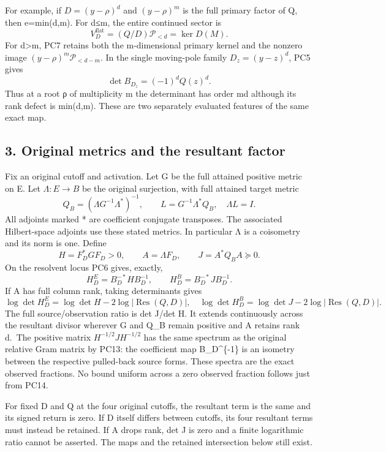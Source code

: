 \documentclass[11pt]{article}
\begin{document}
For example, if \(D=(y-\rho)^d\) and \((y-\rho)^m\) is the full primary factor of Q, then e=min(d,m). For d≤m, the entire continued sector is \[
V_D^{\mathrm{flat}}=(Q/D)\mathcal P_{<d}=\ker D(M).
\tag{PC9}
\] For d\textgreater m, PC7 retains both the m-dimensional primary kernel and the nonzero image \((y-\rho)^m\mathcal P_{<d-m}\). In the single moving-pole family \(D_z=(y-z)^d\), PC5 gives \[
\det B_{D_z}=(-1)^d Q(z)^d.
\tag{PC10}
\] Thus at a root ρ of multiplicity m the determinant has order md although its rank defect is min(d,m). These are two separately evaluated features of the same exact map.

\subsection{3. Original metrics and the resultant factor}\label{original-metrics-and-the-resultant-factor}

Fix an original cutoff and activation. Let G be the full attained positive metric on E. Let \(\Lambda:E\to B\) be the original surjection, with full attained target metric \[
Q_B=(\Lambda G^{-1}\Lambda^*)^{-1},\qquad
L=G^{-1}\Lambda^*Q_B,\quad \Lambda L=I.
\tag{PC11}
\] All adjoints marked * are coefficient conjugate transposes. The associated Hilbert-space adjoints use these stated metrics. In particular Λ is a coisometry and its norm is one. Define \[
H=F_D^*GF_D>0,\qquad A=\Lambda F_D,\qquad J=A^*Q_BA\succeq0.
\tag{PC12}
\] On the resolvent locus PC6 gives, exactly, \[
H_D^E=B_D^{-*}HB_D^{-1},\qquad
H_D^B=B_D^{-*}JB_D^{-1}.
\tag{PC13}
\] If A has full column rank, taking determinants gives \[
\log\det H_D^E=\log\det H-2\log|\operatorname{Res}(Q,D)|,
\quad
\log\det H_D^B=\log\det J-2\log|\operatorname{Res}(Q,D)|.
\tag{PC14}
\] The full source/observation ratio is det J/det H. It extends continuously across the resultant divisor wherever G and Q\_B remain positive and A retains rank d.~The positive matrix \(H^{-1/2}JH^{-1/2}\) has the same spectrum as the original relative Gram matrix by PC13: the coefficient map B\_D\^{}\{-1\} is an isometry between the respective pulled-back source forms. These spectra are the exact observed fractions. No bound uniform across a zero observed fraction follows just from PC14.

For fixed D and Q at the four original cutoffs, the resultant term is the same and its signed return is zero. If D itself differs between cutoffs, its four resultant terms must instead be retained. If A drops rank, det J is zero and a finite logarithmic ratio cannot be asserted. The maps and the retained intersection below still exist.
\end{document}
